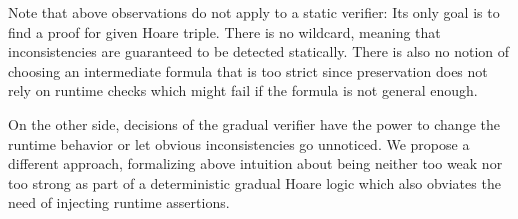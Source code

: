 Note that above observations do not apply to a static verifier:
Its only goal is to find a proof for given Hoare triple.
There is no wildcard, meaning that inconsistencies are guaranteed to be detected statically.
There is also no notion of choosing an intermediate formula that is too strict since preservation does not rely on runtime checks which might fail if the formula is not general enough.

On the other side, decisions of the gradual verifier have the power to change the runtime behavior or let obvious inconsistencies go unnoticed.
We propose a different approach, formalizing above intuition about being neither too weak nor too strong as part of a deterministic gradual Hoare logic which also obviates the need of injecting runtime assertions.



